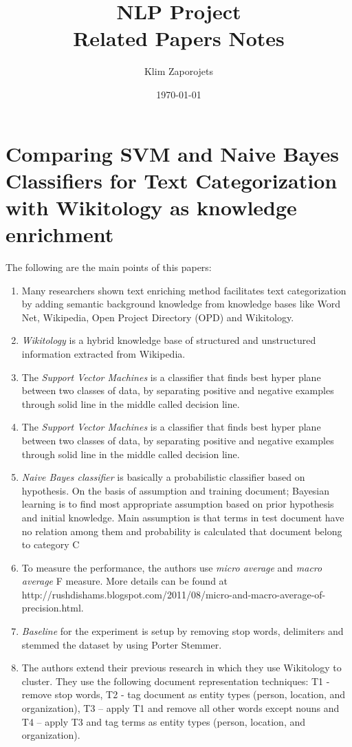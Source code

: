 \documentclass[12pt]{article}
\begin{document}
  \title{NLP Project \\ Related Papers Notes}
\author{Klim Zaporojets}
\date{\today}
\maketitle

\pagebreak

\section{Comparing SVM and Naive Bayes Classifiers for Text Categorization with Wikitology as knowledge enrichment}
The following are the main points of this papers: 
\begin{enumerate}
	\item Many researchers shown text enriching method facilitates text categorization by adding semantic background knowledge from knowledge bases like Word Net, Wikipedia, Open Project Directory (OPD) and Wikitology.
	\item \textit{Wikitology} is a hybrid knowledge base of structured and unstructured information extracted from Wikipedia.
	\item The \textit{Support Vector Machines} is a classifier that finds best hyper plane between two classes of data, by separating positive and negative examples through solid line in the middle called decision line.
	\item The \textit{Support Vector Machines} is a classifier that finds best hyper plane between two classes of data, by separating positive and negative examples through solid line in the middle called decision line.
	\item \textit{Naive Bayes classifier} is basically a probabilistic classifier based on hypothesis. On the basis of assumption and training document; Bayesian learning is to find most appropriate assumption based on prior hypothesis and initial knowledge. Main assumption is that terms in test document have no relation among them and probability is calculated that document belong to category C
	\item To measure the performance, the authors use \textit{micro average} and \textit{macro average} F measure. More details can be found at http://rushdishams.blogspot.com/2011/08/micro-and-macro-average-of-precision.html. 
	\item \textit{Baseline} for the experiment is setup by removing stop words, delimiters and stemmed the dataset by using Porter Stemmer. 
	\item The authors extend their previous research in which they use Wikitology to cluster. They use the following document representation techniques: T1 - remove stop words, T2 - tag document as entity types (person, location, and organization), T3 – apply T1 and remove all other words except nouns and T4 – apply T3 and tag terms as entity types (person, location, and organization). 

\end{enumerate}
\end{document}
